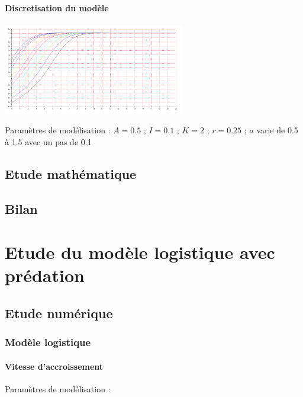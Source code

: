 \documentclass{article}
\begin{document}
\paragraph{Discretisation du modèle}
\begin{center}
\includegraphics[width=300px]{img/part1/TrajPop.png}
\end{center}
Paramètres de modélisation : $A=0.5$ ; $I=0.1$ ; $K=2$ ; $r=0.25$  ; $a$ varie de 0.5 à 1.5 avec un pas de 0.1
\paragraph{}

\newpage

\subsection{Etude mathématique}


\subsection{Bilan}
\paragraph{}

\newpage
\section{Etude du modèle logistique avec prédation}

\subsection{Etude numérique}

\subsubsection{Modèle logistique}

\paragraph{Vitesse d'accroissement}
\begin{center}
\end{center}
Paramètres de modélisation : 
\end{document}
